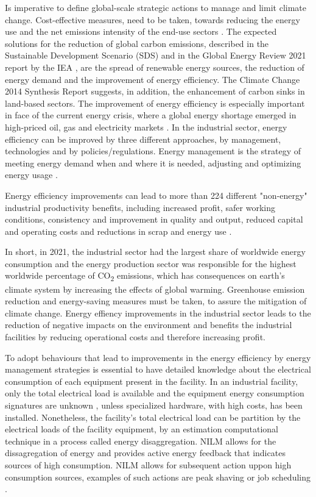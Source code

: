 Is imperative to define global-scale strategic actions to manage and limit climate change. Cost-effective measures, need to be taken, towards reducing the energy use and the net emissions intensity of the end-use sectors \cite{AR5}.
The expected solutions for the reduction of global carbon emissions, described in the Sustainable Development Scenario (SDS) \cite{IEA_Sustainable_Development_Scenario_2021} and in the Global Energy Review 2021 report by the IEA \cite{IEA_GlobalEnergyReview_2021}, are the spread of renewable energy sources, the reduction of energy demand and the improvement of energy efficiency. The Climate Change 2014 Synthesis Report \cite{IPCC2014} suggests, in addition, the enhancement of carbon sinks in land-based sectors.
The improvement of energy efficiency is especially important in face of the current energy crisis, where a global energy shortage emerged in high-priced oil, gas and electricity markets \cite{IEA_WorldEnergyOutlook_2022}.
In the industrial sector, energy efficiency can be improved by three different approaches, by management, technologies and by policies/regulations. Energy management is the strategy of meeting energy demand when and where it is needed, adjusting and optimizing energy usage \cite{EnergySavingStrategiesIndustry}.

Energy efficiency improvements can lead to more than 224 different "non-energy" industrial productivity benefits, including increased profit, safer working conditions, consistency and improvement in quality and output, reduced capital and operating costs and reductions in scrap and energy use \cite{IEA_Benefits_Energy_Efficiency_Improvement, Productivity_Benefits_Energy_Efficiency}.

In short, in 2021, the industrial sector had the largest share of worldwide energy consumption and the energy production sector was responsible for the highest worldwide percentage of CO\textsubscript{2} emissions, which has consequences on earth's climate system by increasing the effects of global warming. Greenhouse emission reduction and energy-saving measures must be taken, to assure the mitigation of climate change.
Energy effiency improvements in the industrial sector leads to the reduction of negative impacts on the environment and benefits the industrial facilities by reducing operational costs and therefore increasing profit.

To adopt behaviours that lead to improvements in the energy efficiency by energy management strategies is essential to have detailed knowledge about the electrical consumption of each equipment present in the facility.
In an industrial facility, only the total electrical load is available and the equipment energy consumption signatures are unknown , unless specialized hardware, with high costs, has been installed. Nonetheless, the facility's total electrical load can be partition by the electrical loads of the facility equipment, by an estimation computational technique in a process called energy disaggregation.
NILM allows for the dissagregation of energy and provides active energy feedback that indicates sources of high consumption. NILM allows for subsequent action uppon high consumption sources, examples of such actions are peak shaving or job scheduling \cite{EnergySavingStrategiesIndustry}.

